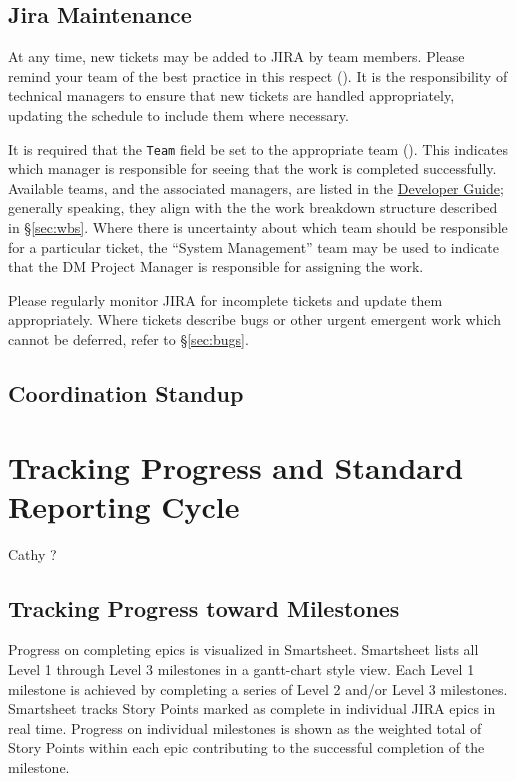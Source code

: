 \subsection{Jira Maintenance}
\label{sec:jira-maintenance}

At any time, new tickets may be added to \gls{JIRA} by team members.
Please remind your team of the best practice in this respect ().
It is the responsibility of technical managers to ensure that new tickets are handled appropriately, updating the schedule to include them where necessary.

It is required that the \texttt{Team} field be set to the appropriate team ().
This indicates which manager is responsible for \gls{seeing} that the work is completed successfully.
Available teams, and the associated managers, are listed in the \href{https://developer.lsst.io/processes/jira_agile.html}{Developer Guide}; generally speaking, they align with the the work breakdown structure described in \S\ref{sec:wbs}.
Where there is uncertainty about which team should be responsible for a particular ticket, the “System Management” team may be used to indicate that the \gls{DM} \gls{Project Manager} is responsible for assigning the work.

Please regularly monitor \gls{JIRA} for incomplete tickets and update them appropriately.
Where tickets describe bugs or other urgent emergent work which cannot be deferred, refer to \S\ref{sec:bugs}.

\subsection{Coordination Standup}
\label{sec:sup}

\section{Tracking Progress and Standard Reporting Cycle}
\label{sec:reporting-cycle}
 Cathy ?
 
\subsection{Tracking Progress toward Milestones}

Progress on completing epics is visualized in Smartsheet.  
Smartsheet lists all Level 1 through Level 3 milestones in a gantt-chart style view.  
Each Level 1 milestone is achieved by completing a series of Level 2 and/or Level 3 milestones.  
Smartsheet tracks Story Points marked as complete in individual \gls{JIRA} epics in real time. 
Progress on individual milestones is shown as the weighted total of Story Points within each epic contributing to the successful completion of the milestone. 
 
